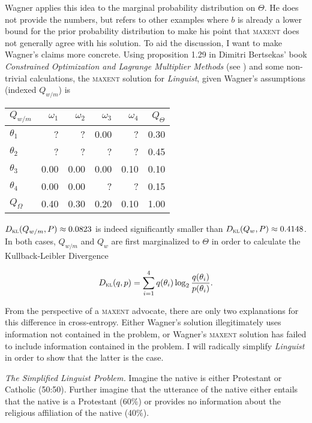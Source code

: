 \documentclass[11pt]{article}
\begin{document}
Wagner applies this idea to the marginal probability distribution on
$\Theta$. He does not provide the numbers, but refers to other
examples where $b$ is already a lower bound for the prior probability
distribution to make his point that \textsc{maxent} does not generally
agree with his solution. To aid the discussion, I want to make
Wagner's claims more concrete. Using proposition 1.29 in Dimitri
Bertsekas' book \emph{Constrained Optimization and Lagrange Multiplier
  Methods} (see ) and some non-trivial
calculations, the \textsc{maxent} solution for \emph{Linguist},
given Wagner's assumptions (indexed $Q_{w/m}$) is

\medskip

\begin{tabular}{|l|r|r|r|r|r|}\hline
  $Q_{w/m}$ & $\omega_{1}$ & $\omega_{2}$ & $\omega_{3}$ & $\omega_{4}$ & $Q_{\Theta}$ \\ \hline
$\theta_{1}$ & ? & ? & 0.00 & ? & 0.30 \\ \hline
$\theta_{2}$ & ? & ? & ? & ? & 0.45 \\ \hline
$\theta_{3}$ & 0.00 & 0.00 & 0.00 & 0.10 & 0.10 \\ \hline
$\theta_{4}$ & 0.00 & 0.00 & ? & ? & 0.15 \\ \hline
$Q_{\Omega}$ & 0.40 & 0.30 & 0.20 & 0.10 & 1.00\\ \hline
\end{tabular}

\medskip

$D_{\textsc{kl}}(Q_{w/m},P)\approx{}0.0823$ is indeed significantly
smaller than $D_{\textsc{kl}}(Q_{w},P)\approx{}0.4148$. In both cases,
$Q_{w/m}$ and $Q_{w}$ are first marginalized to $\Theta$ in order to
calculate the Kullback-Leibler Divergence

\begin{equation}
  \label{eq:kl}
  D_{\textsc{kl}}(q,p)=\sum_{i=1}^{4}q(\theta_{i})\log_{2}\frac{q(\theta_{i})}{p(\theta_{i})}.
\end{equation}

From the perspective of a \textsc{maxent} advocate, there are only
two explanations for this difference in cross-entropy. Either
Wagner's solution illegitimately uses information not contained in
the problem, or Wagner's \textsc{maxent} solution has failed to
include information contained in the problem. I will radically
simplify \emph{Linguist} in order to show that the latter is
the case. 

\begin{quotex}
  \emph{The Simplified Linguist Problem.} Imagine the native is either
  Protestant or Catholic (50:50). Further imagine that the utterance
  of the native either entails that the native is a Protestant (60\%)
  or provides no information about the religious affiliation of the
  native (40\%).
\end{quotex}
\end{document}
